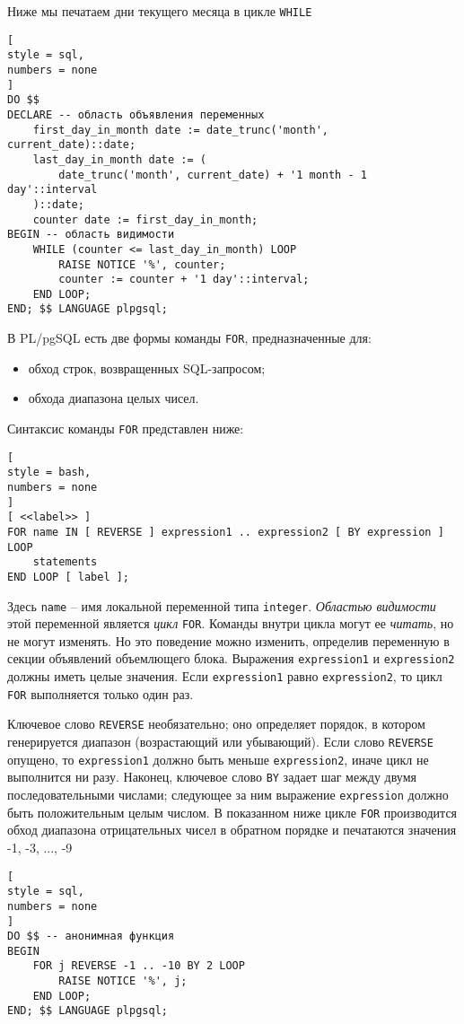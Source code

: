 \documentclass[%
	11pt,
	a4paper,
	utf8,
		]{article}
\begin{document}
Ниже мы печатаем дни текущего месяца в цикле \texttt{WHILE}
\begin{lstlisting}[
style = sql,
numbers = none
]
DO $$
DECLARE -- область объявления переменных
    first_day_in_month date	:= date_trunc('month', current_date)::date;
    last_day_in_month date := (
        date_trunc('month', current_date) + '1 month - 1 day'::interval
    )::date;
    counter date := first_day_in_month;
BEGIN -- область видимости
    WHILE (counter <= last_day_in_month) LOOP
        RAISE NOTICE '%', counter;
        counter := counter + '1 day'::interval;
    END LOOP;
END; $$ LANGUAGE plpgsql;
\end{lstlisting}

В PL/pgSQL есть две формы команды \texttt{FOR}, предназначенные для:
\begin{itemize}
	\item обход строк, возвращенных SQL-запросом;
	
	\item обхода диапазона целых чисел.
\end{itemize}

Синтаксис команды \texttt{FOR} представлен ниже:
\begin{lstlisting}[
style = bash,
numbers = none
]
[ <<label>> ]
FOR name IN [ REVERSE ] expression1 .. expression2 [ BY expression ] LOOP
    statements
END LOOP [ label ];
\end{lstlisting}

Здесь \texttt{name} -- имя локальной переменной типа \texttt{integer}. \emph{Областью видимости} этой переменной является \emph{цикл} \texttt{FOR}. Команды внутри цикла могут ее \emph{читать}, но не могут изменять. Но это поведение можно изменить, определив переменную в секции объявлений объемлющего блока. Выражения \texttt{expression1} и \texttt{expression2} должны иметь целые значения. Если \texttt{expression1} равно \texttt{expression2}, то цикл \texttt{FOR} выполняется только один раз.

Ключевое слово \texttt{REVERSE} необязательно; оно определяет порядок, в котором генерируется диапазон (возрастающий или убывающий). Если слово \texttt{REVERSE} опущено, то \texttt{expression1} должно быть меньше \texttt{expression2}, иначе цикл не выполнится ни разу. Наконец, ключевое слово \texttt{BY} задает шаг между двумя последовательными числами; следующее за ним выражение \texttt{expression} должно быть положительным целым числом. В показанном ниже цикле \texttt{FOR} производится обход диапазона отрицательных чисел в обратном порядке и печатаются значения -1, -3, ..., -9
\begin{lstlisting}[
style = sql,
numbers = none
]
DO $$ -- анонимная функция
BEGIN
    FOR j REVERSE -1 .. -10 BY 2 LOOP
        RAISE NOTICE '%', j;
    END LOOP;
END; $$ LANGUAGE plpgsql;
\end{lstlisting}
\end{document}
